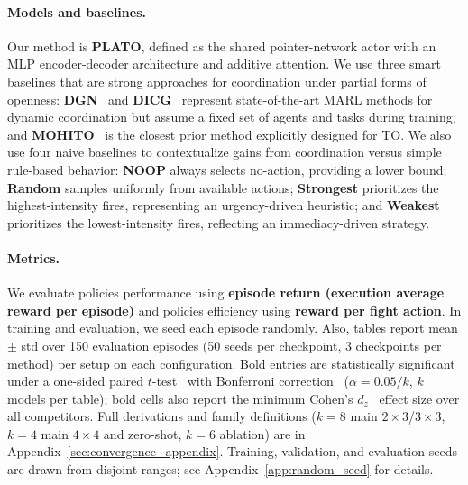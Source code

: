 \paragraph{Models and baselines.}\label{sec:models_metrics} 
Our method is \textbf{PLATO}, defined as the shared pointer-network actor with an MLP encoder-decoder architecture and additive attention. We use three smart baselines that are strong approaches for coordination under partial forms of openness: \textbf{DGN}~\cite{dgn} and \textbf{DICG}~\cite{dicg} represent state-of-the-art MARL methods for dynamic coordination but assume a fixed set of agents and tasks during training; and \textbf{MOHITO}~\cite{anilmohito} is the closest prior method explicitly designed for TO.  We also use four naive baselines to contextualize gains from coordination versus simple rule-based behavior: \textbf{NOOP} always selects no-action, providing a lower bound; \textbf{Random} samples uniformly from available actions; \textbf{Strongest} prioritizes the highest-intensity fires, representing an urgency-driven heuristic; and \textbf{Weakest} prioritizes the lowest-intensity fires, reflecting an immediacy-driven strategy.

\paragraph{Metrics.} 
We evaluate policies performance using \textbf{episode return (execution average reward per episode)} and policies efficiency using \textbf{reward per fight action}. In training and evaluation, we seed each episode randomly.  Also, tables report mean $\pm$ std over 150 evaluation episodes (50 seeds per checkpoint, 3 checkpoints per method) per setup on each configuration. Bold entries are statistically significant under a one-sided paired $t$-test~\cite{student1908probable} with Bonferroni correction~\cite{hochberg1987multiple} ($\alpha{=}0.05/k$, $k$ models per table); bold cells also report the minimum Cohen's $d_z$~\cite{cohen1988statistical} effect size over all competitors. Full derivations and family definitions ($k{=}8$ main $2{\times}3$/$3{\times}3$, $k{=}4$ main $4{\times}4$ and zero-shot, $k{=}6$ ablation) are in Appendix~\ref{sec:convergence_appendix}. Training, validation, and evaluation seeds are drawn from disjoint ranges; see Appendix~\ref{app:random_seed} for details.




